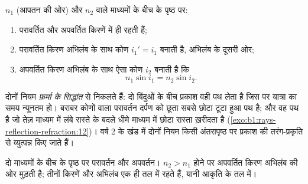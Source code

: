 \begin{theorem}[परावर्तन और अपवर्तन के नियम (स्नेल--देकार्त)]\label{thm:b1:rays-reflection-refraction:snell}
 $n_1$ (आपतन की ओर) और $n_2$ वाले माध्यमों के बीच के पृष्ठ पर:
\begin{enumerate}
  \item परावर्तित और अपवर्तित किरणें  में ही रहती हैं;
  \item परावर्तित किरण अभिलंब के साथ कोण $i_1' = i_1$ बनाती है, अभिलंब के
        दूसरी ओर;
  \item अपवर्तित किरण अभिलंब के साथ ऐसा कोण $i_2$ बनाती है कि
        \[
        n_1 \sin i_1 = n_2 \sin i_2 .
        \]
\end{enumerate}
\end{theorem}
\admitted

\begin{remark}[ये नियम कहाँ से आते हैं]\label{rem:b1:rays-reflection-refraction:fermat}
दोनों नियम \emph{फ़र्मा के सिद्धांत} से निकलते हैं: दो बिंदुओं के बीच प्रकाश
वही पथ लेता है जिस पर यात्रा का समय न्यूनतम हो। बराबर कोणों वाला परावर्तन
दर्पण को छूता सबसे छोटा टूटा हुआ पथ है; और  वह पथ है जो तेज़
माध्यम में लंबे रास्ते के बदले धीमे माध्यम में छोटा रास्ता ख़रीदता है
(\cref{exo:b1:rays-reflection-refraction:12})। वर्ष 2 के खंड में दोनों नियम
किसी अंतरापृष्ठ पर प्रकाश की तरंग-प्रकृति से व्युत्पन्न किए जाते हैं।
\end{remark}

\begin{omfigure}

{\small दो माध्यमों के बीच के पृष्ठ पर परावर्तन और अपवर्तन।
$n_2 > n_1$ होने पर अपवर्तित किरण अभिलंब की ओर मुड़ती है; तीनों किरणें और
अभिलंब एक ही तल में रहते हैं, यानी आकृति के तल में।}
\end{omfigure}

